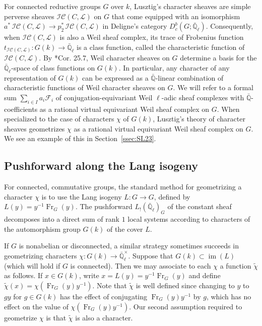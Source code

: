\documentclass[10pt]{amsart}
\theoremstyle{plain}
\theoremstyle{definition}
\newcommand{\QQ}{{\mathbb{Q}}}
\newcommand{\EE}{\mathbb{\bar Q}_\ell}
\newcommand{\EEx}{\EE^\times}
\newcommand{\Frob}[1]{\operatorname{Fr}_{#1}}
\DeclareMathOperator{\image}{im}
\newcommand{\trFrob}[1]{t_{#1}}
\newcommand{\cs}[1]{{\mathcal{#1}}}
\newcommand{\IC}{\mathcal{IC}}
\begin{document}
For connected reductive groups $G$ over $k$, Lusztig's character sheaves are simple perverse sheaves $\IC(C,\mathcal{L})$ on $G$ that come equipped with an isomorphism $a^*\, \IC(C,\mathcal{L}) \to p_2^*\, \IC(C,\mathcal{L})$ in Deligne's category $D^b_c(G;\EE)$.
Consequently, when $\IC(C,\mathcal{L})$ is also a Weil sheaf complex, its trace of Frobenius function $\trFrob{\IC(C,\cs{L})} : G(k)\to \EE$ is a class function, called the characteristic function of $\IC(C,\cs{L})$.
By \cite{lusztig:86a}*{Cor. 25.7}, Weil character sheaves on $G$ determine a basis for the $\EE$-space of class functions on $G(k)$.
In particular, any character of any representation of $G(k)$ can be expressed as a ${\bar \QQ}$-linear combination of characteristic functions of Weil character sheaves on $G$.
We will refer to a formal sum $\sum_{i\in I} a_i \cs{F}_i$ of conjugation-equivariant Weil $\ell$-adic sheaf complexes with ${\bar \QQ}$-coefficients as a rational virtual equivariant Weil sheaf complex on $G$.
When specialized to the case of characters $\chi$ of $G(k)$, Lusztig's theory of character sheaves geometrizes $\chi$ as a rational virtual equivariant Weil sheaf complex on $G$.
We see an example of this in Section~\ref{ssec:SL23}.
 
\subsection{Pushforward along the Lang isogeny}

For connected, commutative groups, the standard method for geometrizing a character $\chi$ is to use the Lang isogeny $L : G \to G$, defined by $L(y) = y^{-1}\Frob{G}(y)$.  The pushforward $L_! (\EE)_G$ of the constant sheaf decomposes into a direct sum of rank $1$ local systems according to characters of the automorphism group $G(k)$ of the cover $L$.

If $G$ is nonabelian or disconnected, a similar strategy sometimes succeeds in geometrizing characters $\chi : G(k) \to \EEx$.
Suppose that $G(k) \subset \image(L)$ (which will hold if $G$ is connected).  Then we may associate to each $\chi$ a function $\tilde{\chi}$ as follows.
If $x \in G(k)$, write $x = L(y) = y^{-1}\Frob{G}(y)$ and define $\tilde{\chi}(x) = \chi(\Frob{G}(y) y^{-1})$.
Note that $\tilde{\chi}$ is well defined since changing to $y$ to $gy$ for $g \in G(k)$ has the
effect of conjugating $\Frob{G}(y) y^{-1}$ by $g$, which has no effect on the value of $\chi(\Frob{G}(y) y^{-1})$.
Our second assumption required to geometrize $\chi$ is that $\tilde{\chi}$ is also a character.
\end{document}
